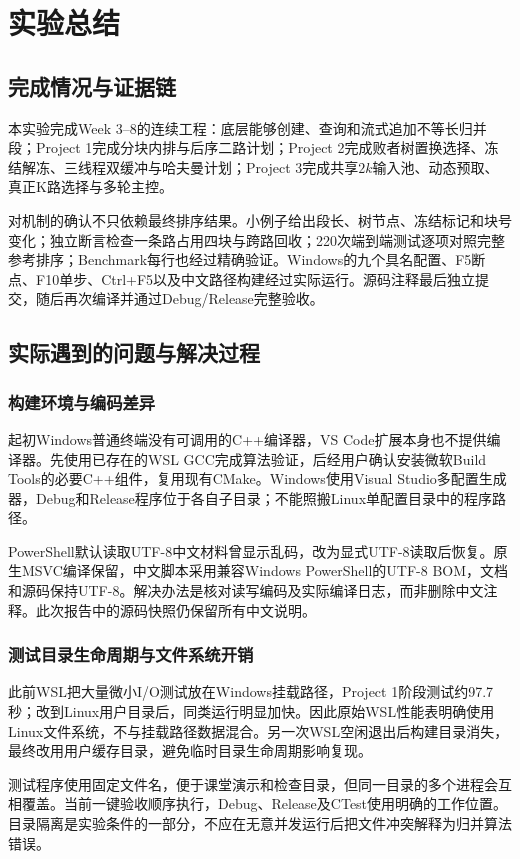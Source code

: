 \chapter{实验总结}
\section{完成情况与证据链}
本实验完成Week 3--8的连续工程：底层能够创建、查询和流式追加不等长归并段；Project 1完成分块内排与后序二路计划；Project 2完成败者树置换选择、冻结解冻、三线程双缓冲与哈夫曼计划；Project 3完成共享$2k$输入池、动态预取、真正K路选择与多轮主控。

对机制的确认不只依赖最终排序结果。小例子给出段长、树节点、冻结标记和块号变化；独立断言检查一条路占用四块与跨路回收；220次端到端测试逐项对照完整参考排序；Benchmark每行也经过精确验证。Windows的九个具名配置、F5断点、F10单步、Ctrl+F5以及中文路径构建经过实际运行。源码注释最后独立提交，随后再次编译并通过Debug/Release完整验收。

\section{实际遇到的问题与解决过程}
\subsection{构建环境与编码差异}
起初Windows普通终端没有可调用的C++编译器，VS Code扩展本身也不提供编译器。先使用已存在的WSL GCC完成算法验证，后经用户确认安装微软Build Tools的必要C++组件，复用现有CMake。Windows使用Visual Studio多配置生成器，Debug和Release程序位于各自子目录；不能照搬Linux单配置目录中的程序路径。

PowerShell默认读取UTF-8中文材料曾显示乱码，改为显式UTF-8读取后恢复。原生MSVC编译保留，中文脚本采用兼容Windows PowerShell的UTF-8 BOM，文档和源码保持UTF-8。解决办法是核对读写编码及实际编译日志，而非删除中文注释。此次报告中的源码快照仍保留所有中文说明。

\subsection{测试目录生命周期与文件系统开销}
此前WSL把大量微小I/O测试放在Windows挂载路径，Project 1阶段测试约97.7秒；改到Linux用户目录后，同类运行明显加快。因此原始WSL性能表明确使用Linux文件系统，不与挂载路径数据混合。另一次WSL空闲退出后构建目录消失，最终改用用户缓存目录，避免临时目录生命周期影响复现。

测试程序使用固定文件名，便于课堂演示和检查目录，但同一目录的多个进程会互相覆盖。当前一键验收顺序执行，Debug、Release及CTest使用明确的工作位置。目录隔离是实验条件的一部分，不应在无意并发运行后把文件冲突解释为归并算法错误。


